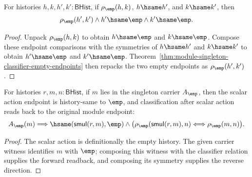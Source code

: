 \begin{theorem}
\label{thm:module-singleton-classifier-hsame-endpoint-transport}
For histories $h,k,h',k':\mathsf{BHist}$, if
$\rho_{\emp}(h,k)$, $h\hsame h'$, and $k\hsame k'$, then
$$
\rho_{\emp}(h',k')\land h'\hsame\emp\land k'\hsame\emp.
$$
\end{theorem}
\begin{proof}
Unpack $\rho_{\emp}(h,k)$ to obtain $h\hsame\emp$ and
$k\hsame\emp$. Compose these endpoint comparisons with the symmetries of
$h\hsame h'$ and $k\hsame k'$ to obtain $h'\hsame\emp$ and
$k'\hsame\emp$. Theorem~\ref{thm:module-singleton-classifier-empty-endpoints}
then repacks the two empty endpoints as $\rho_{\emp}(h',k')$.
\end{proof}

\begin{theorem}
\label{thm:module-singleton-smul-classifier-readback-iff}
For histories $r,m,n:\mathsf{BHist}$, if $m$ lies in the singleton carrier
$A_{\emp}$, then the scalar action endpoint is history-same to $\emp$, and
classification after scalar action reads back to the original module endpoint:
$$
A_{\emp}(m)\Longrightarrow
\hsame(\mathsf{smul}(r,m),\emp)\land
\bigl(\rho_{\emp}(\mathsf{smul}(r,m),n)
\Longleftrightarrow
\rho_{\emp}(m,n)\bigr).
$$
\end{theorem}
\begin{proof}
The scalar action is definitionally the empty history. The given carrier
witness identifies $m$ with $\emp$; composing this witness with the classifier
relation supplies the forward readback, and composing its symmetry supplies the
reverse direction.
\end{proof}

